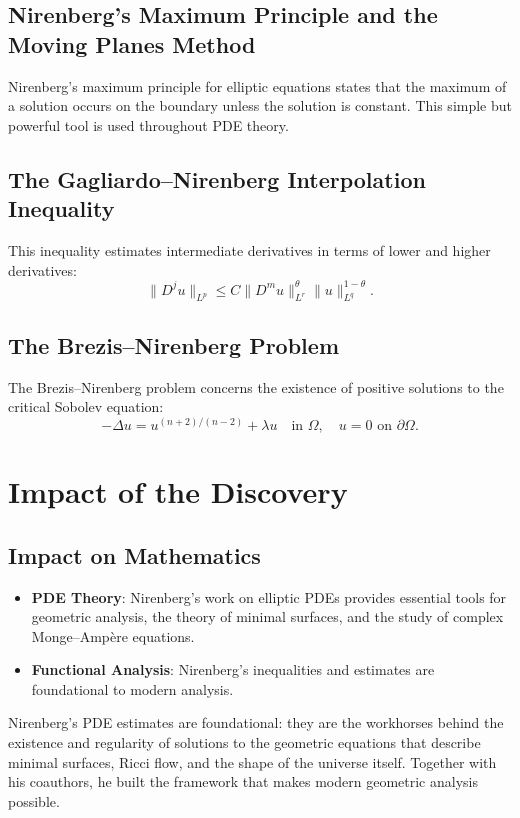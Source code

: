 \subsection{Nirenberg's Maximum Principle and the Moving Planes Method}

Nirenberg's maximum principle for elliptic equations states that the maximum of a solution occurs on the boundary unless the solution is constant. This simple but powerful tool is used throughout PDE theory.

\subsection{The Gagliardo--Nirenberg Interpolation Inequality}

This inequality estimates intermediate derivatives in terms of lower and higher derivatives:
\[
\|D^j u\|_{L^p} \leq C \|D^m u\|_{L^r}^\theta \|u\|_{L^q}^{1-\theta}.
\]

\subsection{The Brezis--Nirenberg Problem}

The Brezis--Nirenberg problem concerns the existence of positive solutions to the critical Sobolev equation:
\[
-\Delta u = u^{(n+2)/(n-2)} + \lambda u \quad \text{in } \Omega, \quad u = 0 \text{ on } \partial\Omega.
\]

\section{Impact of the Discovery}

\subsection{Impact on Mathematics}

\begin{itemize}
\item \textbf{PDE Theory}: Nirenberg's work on elliptic PDEs provides essential tools for geometric analysis, the theory of minimal surfaces, and the study of complex Monge--Amp\`ere equations.

\item \textbf{Functional Analysis}: Nirenberg's inequalities and estimates are foundational to modern analysis.

\end{itemize}

\begin{whyitmatters}
Nirenberg's PDE estimates are foundational: they are the workhorses behind the existence and regularity of solutions to the geometric equations that describe minimal surfaces, Ricci flow, and the shape of the universe itself. Together with his coauthors, he built the framework that makes modern geometric analysis possible.
\end{whyitmatters}

